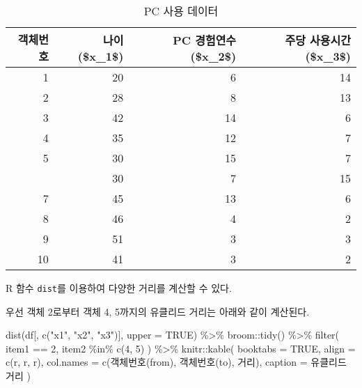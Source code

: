 \documentclass[
]{book}
\newenvironment{Shaded}{\begin{snugshade}}{\end{snugshade}}
\newcommand{\AttributeTok}[1]{\textcolor[rgb]{0.77,0.63,0.00}{#1}}
\newcommand{\ConstantTok}[1]{\textcolor[rgb]{0.00,0.00,0.00}{#1}}
\newcommand{\DecValTok}[1]{\textcolor[rgb]{0.00,0.00,0.81}{#1}}
\newcommand{\FunctionTok}[1]{\textcolor[rgb]{0.00,0.00,0.00}{#1}}
\newcommand{\NormalTok}[1]{#1}
\newcommand{\SpecialCharTok}[1]{\textcolor[rgb]{0.00,0.00,0.00}{#1}}
\newcommand{\StringTok}[1]{\textcolor[rgb]{0.31,0.60,0.02}{#1}}
\begin{document}
\begin{table}

\caption{\label{tab:pc-user}PC 사용 데이터}
\centering
\begin{tabular}[t]{rrrr}
\toprule
객체번호 & 나이(\$x\_1\$) & PC 경험연수(\$x\_2\$) & 주당 사용시간(\$x\_3\$)\\
\midrule
1 & 20 & 6 & 14\\
2 & 28 & 8 & 13\\
3 & 42 & 14 & 6\\
4 & 35 & 12 & 7\\
5 & 30 & 15 & 7\\
\addlinespace
6 & 30 & 7 & 15\\
7 & 45 & 13 & 6\\
8 & 46 & 4 & 2\\
9 & 51 & 3 & 3\\
10 & 41 & 3 & 2\\
\bottomrule
\end{tabular}
\end{table}

R 함수 \texttt{dist}를 이용하여 다양한 거리를 계산할 수 있다.

우선 객체 2로부터 객체 4, 5까지의 유클리드 거리는 아래와 같이 계산된다.

\begin{Shaded}
\begin{Highlighting}[]
\FunctionTok{dist}\NormalTok{(df[, }\FunctionTok{c}\NormalTok{(}\StringTok{"x1"}\NormalTok{, }\StringTok{"x2"}\NormalTok{, }\StringTok{"x3"}\NormalTok{)], }\AttributeTok{upper =} \ConstantTok{TRUE}\NormalTok{) }\SpecialCharTok{\%\textgreater{}\%}
\NormalTok{  broom}\SpecialCharTok{::}\FunctionTok{tidy}\NormalTok{() }\SpecialCharTok{\%\textgreater{}\%}
  \FunctionTok{filter}\NormalTok{(}
\NormalTok{    item1 }\SpecialCharTok{==} \DecValTok{2}\NormalTok{,}
\NormalTok{    item2 }\SpecialCharTok{\%in\%} \FunctionTok{c}\NormalTok{(}\DecValTok{4}\NormalTok{, }\DecValTok{5}\NormalTok{)}
\NormalTok{  ) }\SpecialCharTok{\%\textgreater{}\%}
\NormalTok{  knitr}\SpecialCharTok{::}\FunctionTok{kable}\NormalTok{(}
    \AttributeTok{booktabs =} \ConstantTok{TRUE}\NormalTok{,}
    \AttributeTok{align =} \FunctionTok{c}\NormalTok{(}\StringTok{\textquotesingle{}r\textquotesingle{}}\NormalTok{, }\StringTok{\textquotesingle{}r\textquotesingle{}}\NormalTok{, }\StringTok{\textquotesingle{}r\textquotesingle{}}\NormalTok{),}
    \AttributeTok{col.names =} \FunctionTok{c}\NormalTok{(}\StringTok{\textquotesingle{}객체번호(from)\textquotesingle{}}\NormalTok{, }\StringTok{\textquotesingle{}객체번호(to)\textquotesingle{}}\NormalTok{, }\StringTok{\textquotesingle{}거리\textquotesingle{}}\NormalTok{),}
    \AttributeTok{caption =} \StringTok{\textquotesingle{}유클리드 거리\textquotesingle{}}
\NormalTok{  )}
\end{Highlighting}
\end{Shaded}
\end{document}
